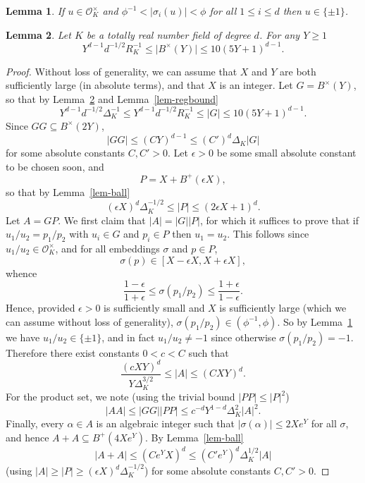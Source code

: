 \documentclass[10pt,a4paper]{amsart}
\newtheorem{lemma}{Lemma}
\newcommand{\Abs}[1]{\lvert #1\rvert}
\newcommand{\abs}[1]{\mathopen{}\left| #1\mathclose{}\right|}
\begin{document}
\begin{lemma}\label{lem-unitsep}
If $u\in \mathcal{O}_K^\times$ and $\phi^{-1}< \Abs{\sigma_i(u)}<\phi$ for all $1\leq i\leq d$ then $u\in\{\pm 1\}$. 
\end{lemma}

\begin{lemma}\label{lem-ball-mult}
Let $K$ be a totally real number field of degree $d$. For any $Y\geq 1$
\[Y^{d-1}d^{-1/2}R_K^{-1}\leq \Abs{B^\times(Y)}\leq 10(5Y+1)^{d-1}.\] 
\end{lemma}

\begin{proof}
Without loss of generality, we can assume that $X$ and $Y$ are both sufficiently large (in absolute terms), and that $X$ is an integer. Let $G=B^\times(Y)$, so that by Lemma~\ref{lem-ball-mult} and Lemma~\ref{lem-regbound}
\[Y^{d-1}d^{-1/2}\Delta_K^{-1}\leq Y^{d-1}d^{-1/2}R_K^{-1}\leq \abs{G}\leq 10(5Y+1)^{d-1}.\]
Since $GG\subseteq B^\times(2Y)$,
\[\Abs{GG}\leq (CY)^{d-1}\leq (C')^d\Delta_K\abs{G}\]
for some absolute constants $C,C'>0$. Let $\epsilon>0$ be some small absolute constant to be chosen soon, and 
\[P=X+B^+(\epsilon X),\]
so that by Lemma~\ref{lem-ball}
\[(\epsilon X)^d\Delta_K^{-1/2}\leq\abs{P}\leq(2\epsilon X+1)^d.\]
Let $A=GP$. We first claim that $\abs{A}=\abs{G}\abs{P}$, for which it suffices to prove that if $u_1/u_2=p_1/p_2$ with $u_i\in G$ and $p_i\in P$ then $u_1= u_2$. This follows since $u_1/u_2\in \mathcal{O}_K^\times$, and for all embeddings $\sigma$ and $p\in P$,
\[\sigma(p)\in [X-\epsilon X, X+\epsilon X],\]
whence 
\[\frac{1-\epsilon}{1+\epsilon}\leq \sigma(p_1/p_2)\leq \frac{1+\epsilon}{1-\epsilon}.\]
Hence, provided $\epsilon>0$ is sufficiently small and $X$ is sufficiently large (which we can assume without loss of generality), $\sigma(p_1/p_2)\in (\phi^{-1},\phi)$. So by Lemma~\ref{lem-unitsep} we have $u_1/u_2\in \{\pm 1\}$, and in fact $u_1/u_2\neq -1$ since otherwise $\sigma(p_1/p_2)=-1$. Therefore there exist constants $0<c<C$ such that
\[\frac{(cXY)^d}{Y\Delta_K^{3/2}}\leq \abs{A}\leq (CXY)^d.\]
For the product set, we note (using the trivial bound $\abs{PP}\leq \abs{P}^2$)
\[\Abs{AA}\leq \Abs{GG}\Abs{PP}\leq  c^{-d}Y^{1-d}\Delta_K^2\abs{A}^2.\]
Finally, every $\alpha\in A$ is an algebraic integer such that $\Abs{\sigma(\alpha)}\leq 2Xe^Y$ for all $\sigma$, and hence $A+A\subseteq B^+(4Xe^Y)$. By Lemma~\ref{lem-ball}
\[\abs{A+A}\leq (Ce^YX)^d\leq (C'e^Y)^d\Delta_K^{1/2}\abs{A}\]
(using $\abs{A}\geq \abs{P}\geq (\epsilon X)^d\Delta_K^{-1/2}$) for some absolute constants $C,C'>0$.
\end{proof}
\end{document}
